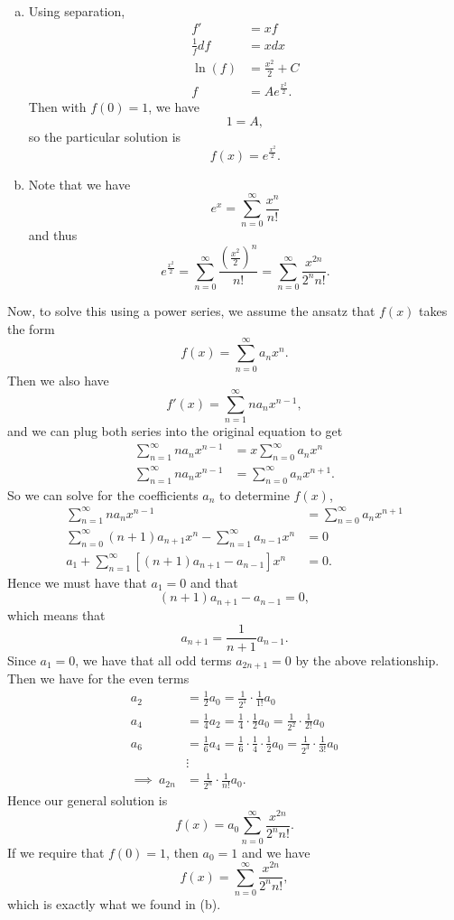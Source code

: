 \documentclass[12pt]{article} %
\begin{document}
\begin{solution}~
\begin{enumerate}[(a)]
    \item Using separation,
    \begin{align*}
        f'&=xf\\
        \frac{1}{f}df&=xdx\\
        \ln(f)&= \frac{x^2}{2}+C\\
        f&= Ae^{\frac{x^2}{2}}.
    \end{align*}
    Then with $f(0)=1$, we have
    \[
    1=A,
    \]
    so the particular solution is
    \[
    f(x)=e^{\frac{x^2}{2}}.
    \]
    \item Note that we have
    \[
    e^{x}=\sum_{n=0}^\infty \frac{x^n}{n!}
    \]
    and thus
    \[
    e^{\frac{x^2}{2}}= \sum_{n=0}^\infty \frac{ \left( \frac{x^2}{2}\right)^n}{n!} = \sum_{n=0}^\infty \frac{x^{2n}}{2^nn!}.
    \]
\end{enumerate}
\item Now, to solve this using a power series, we assume the ansatz that $f(x)$ takes the form
\[
f(x)=\sum_{n=0}^\infty a_nx^n.
\]
Then we also have
\[
f'(x)=\sum_{n=1}^\infty na_n x^{n-1},
\]
and we can plug both series into the original equation to get
\begin{align*}
    \sum_{n=1}^\infty na_n x^{n-1} &= x \sum_{n=0}^\infty a_nx^n\\
    \sum_{n=1}^\infty na_nx^{n-1}&= \sum_{n=0}^\infty a_nx^{n+1}.
\end{align*}
So we can solve for the coefficients $a_n$ to determine $f(x)$,
\begin{align*}
    \sum_{n=1}^\infty na_nx^{n-1}&= \sum_{n=0}^\infty a_nx^{n+1}\\
    \sum_{n=0}^\infty (n+1)a_{n+1} x^n - \sum_{n=1}^\infty a_{n-1}x^n &=0\\
    a_1 + \sum_{n=1}^\infty \left[ (n+1)a_{n+1} - a_{n-1}\right]x^n &=0.
\end{align*}
Hence we must have that $a_1=0$ and that
\[
(n+1)a_{n+1}-a_{n-1}=0,
\]
which means that
\[
a_{n+1}= \frac{1}{n+1} a_{n-1}.
\]
Since $a_1=0$, we have that all odd terms $a_{2n+1}=0$ by the above relationship. Then we have for the even terms
\begin{align*}
    a_2 &= \frac{1}{2} a_0 = \frac{1}{2^1}\cdot \frac{1}{1!}a_0\\
    a_4 &= \frac{1}{4} a_2 = \frac{1}{4}\cdot \frac{1}{2} a_0 = \frac{1}{2^2}\cdot \frac{1}{2!}a_0\\
    a_6 &= \frac{1}{6}a_4 = \frac{1}{6}\cdot \frac{1}{4}\cdot \frac{1}{2}a_0 = \frac{1}{2^3} \cdot \frac{1}{3!}a_0\\
    &\vdots\\
    \implies~a_{2n}&= \frac{1}{2^n}\cdot \frac{1}{n!} a_0.
\end{align*}
Hence our general solution is
\[
f(x)=a_0 \sum_{n=0}^\infty \frac{x^{2n}}{2^n n!}.
\]
If we require that $f(0)=1$, then $a_0=1$ and we have
\[
f(x)=\sum_{n=0}^\infty \frac{x^{2n}}{2^n n!},
\]
which is exactly what we found in (b).
\end{solution}
\end{document}
